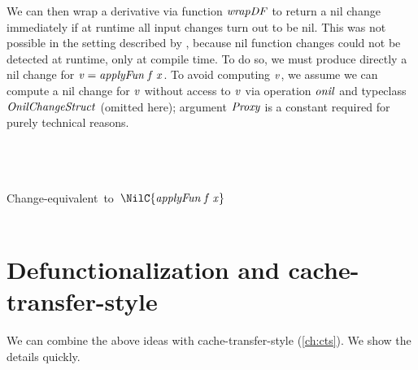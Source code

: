 We can then wrap a derivative via function \ensuremath{\Varid{wrapDF}} to return a nil change immediately if at runtime
all input changes turn out to be nil. This was not possible in the setting
described by \citet{CaiEtAl2014ILC}, because
nil function changes could not be detected at runtime, only at compile time.
To do so, we must produce directly a nil change for \ensuremath{\Varid{v}\mathrel{=}\Varid{applyFun}\;\Varid{f}\;\Varid{x}}. To avoid
computing \ensuremath{\Varid{v}}, we assume we can compute a nil change for \ensuremath{\Varid{v}} without access to
\ensuremath{\Varid{v}} via operation \ensuremath{\Varid{onil}} and typeclass \ensuremath{\Conid{OnilChangeStruct}} (omitted here);
argument \ensuremath{\Conid{Proxy}} is a constant required for purely technical reasons.
\begin{hscode}\SaveRestoreHook
{}%
%
%
%
\>[B]{}\mathrel{:\mkern-1mu:}\;\tau\Rightarrow{}\;\sigma\;\tau\to {}\;\sigma\;\tau\to \sigma\to \Delta \sigma\to \Delta \tau{}\<[E]%
\\
\>[B]{}\;\;\;\;\mathrel{=}{}\<[E]%
\\
\>[B]{}\<[3]%
\>[3]{}\;\;\;\<[E]%
\\
\>[3]{}\<[5]%
\>[5]{}\;\mbox{\onelinecomment  Change-equivalent to \ensuremath{\NilC{\Varid{applyFun}\;\Varid{f}\;\Varid{x}}}}{}\<[E]%
\\
\>[B]{}\<[3]%
\>[3]{}\<[E]%
\\
\>[3]{}\<[5]%
\>[5]{}\;\;\;\;\<[E]%
\ColumnHook
\end{hscode}\resethooks

\section{Defunctionalization and cache-transfer-style}
We can combine the above ideas with cache-transfer-style (\cref{ch:cts}). We
show the details quickly.

